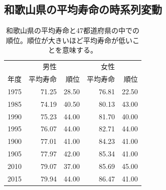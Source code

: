 


\subsection{和歌山県の平均寿命の時系列変動}







\begin{table}[ht]
\centering
\begin{tabular}{r|rr|rr}
  \hline
	 & 男性 &  & 女性 &  \\
	年度 & 平均寿命 & 順位 & 平均寿命 & 順位 \\
  \hline
  1975 & 71.25 & 28.50 & 76.81 & 22.50 \\
  1985 & 74.19 & 40.50 & 80.13 & 43.00 \\
  1990 & 75.23 & 44.00 & 81.70 & 40.00 \\
  1995 & 76.07 & 44.00 & 82.71 & 44.00 \\
  1900 & 77.01 & 41.00 & 84.23 & 41.00 \\
  1905 & 77.97 & 42.00 & 85.34 & 41.00 \\
  2010 & 79.07 & 37.00 & 85.69 & 45.00 \\
  2015 & 79.94 & 44.00 & 86.47 & 41.00 \\
   \hline
\end{tabular}
\caption{和歌山県の平均寿命と47都道府県の中での順位。順位が大きいほど平均寿命が低いことを意味する。}

\end{table}





